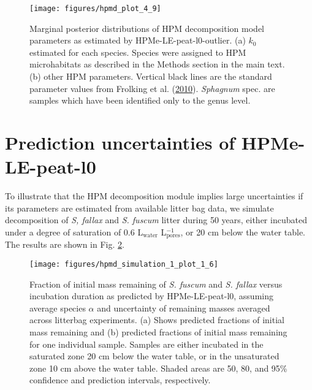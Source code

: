 \documentclass[
  12pt,
]{article}
\begin{document}
\begin{figure}[H]

{\centering \texttt{[image: figures/hpmd\_plot\_4\_9]} 

}

\caption{Marginal posterior distributions of HPM decomposition model parameters as estimated by HPMe-LE-peat-l0-outlier. (a) \(k_0\) estimated for each species. Species were assigned to HPM microhabitats as described in the Methods section in the main text. (b) other HPM parameters. Vertical black lines are the standard parameter values from Frolking et al. (\protect\hyperlink{ref-Frolking.2010}{2010}). \emph{Sphagnum} spec. are samples which have been identified only to the genus level.}\label{fig:sup-hpmd-plot-4-9}
\end{figure}

\hypertarget{sup-11}{%
\section{Prediction uncertainties of HPMe-LE-peat-l0}\label{sup-11}}

To illustrate that the HPM decomposition module implies large uncertainties if its parameters are estimated from available litter bag data, we simulate decomposition of \emph{S, fallax} and \emph{S. fuscum} litter during 50 years, either incubated under a degree of saturation of 0.6 L\(_\text{water}\) L\(_\text{pores}^{-1}\), or 20 cm below the water table. The results are shown in Fig. \ref{fig:sup-hpmd-simulation-1-plot-6}.



\begin{figure}[H]

{\centering \texttt{[image: figures/hpmd\_simulation\_1\_plot\_1\_6]} 

}

\caption{Fraction of initial mass remaining of \emph{S. fuscum} and \emph{S. fallax} versus incubation duration as predicted by HPMe-LE-peat-l0, assuming average species \(\alpha\) and uncertainty of remaining masses averaged across litterbag experiments. (a) Shows predicted fractions of initial mass remaining and (b) predicted fractions of initial mass remaining for one individual sample. Samples are either incubated in the saturated zone 20 cm below the water table, or in the unsaturated zone 10 cm above the water table. Shaded areas are 50, 80, and 95\% confidence and prediction intervals, respectively.}\label{fig:sup-hpmd-simulation-1-plot-6}
\end{figure}
\end{document}
